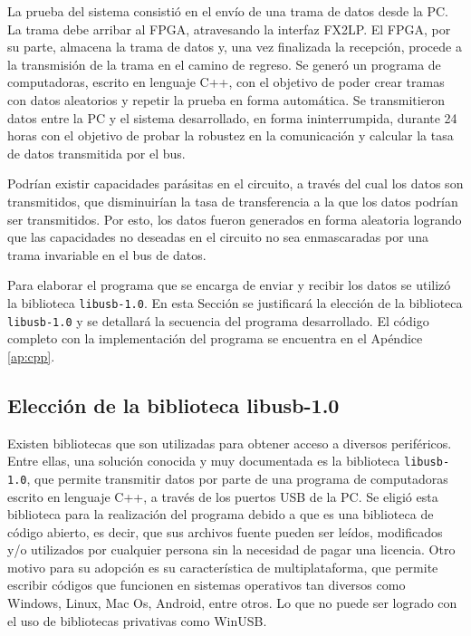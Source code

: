 
La prueba del sistema consistió en el envío de una trama de datos desde la PC. La trama debe arribar al FPGA, atravesando la interfaz FX2LP.
El FPGA, por su parte, almacena la trama de datos y, una vez finalizada la recepción, procede a la transmisión de la trama en el camino de regreso. 
Se generó un programa de computadoras, escrito en lenguaje C++, con el objetivo de poder crear tramas con datos aleatorios y repetir la prueba en forma automática.
Se transmitieron datos entre la PC y el sistema desarrollado, en forma ininterrumpida, durante 24 horas con el objetivo de probar la robustez en la comunicación y calcular la tasa de datos transmitida por el bus.

Podrían existir capacidades parásitas en el circuito, a través del cual los datos son transmitidos, que disminuirían la tasa de transferencia a la que los datos podrían ser transmitidos. Por esto, los datos fueron generados en forma aleatoria logrando que las capacidades no deseadas en el circuito no sea enmascaradas por una trama invariable en el bus de datos.

Para elaborar el programa que se encarga de enviar y recibir los datos se utilizó la biblioteca \verb|libusb-1.0|.
En esta Sección se justificará la elección de la biblioteca \verb|libusb-1.0| y se detallará la secuencia del programa desarrollado.
El código completo con la implementación del programa se encuentra en el Apéndice \ref{ap:cpp}.

\subsection{Elección de la biblioteca libusb-1.0}
	Existen bibliotecas que son utilizadas para obtener acceso a diversos periféricos. Entre ellas, una solución conocida y muy documentada es la biblioteca \verb|libusb-1.0|, que permite transmitir datos por parte de una programa de computadoras escrito en lenguaje C++, a través de los puertos USB de la PC.
	Se eligió esta biblioteca para la realización del programa debido a que es una biblioteca de código abierto, es decir, que sus archivos fuente pueden ser leídos, modificados y/o utilizados por cualquier persona sin la necesidad de pagar una licencia.  Otro motivo para su adopción es su característica de multiplataforma, que permite escribir códigos que funcionen en sistemas operativos tan diversos como Windows, Linux, Mac Os, Android, entre otros. Lo que no puede ser logrado con el uso de bibliotecas privativas como WinUSB.
	
